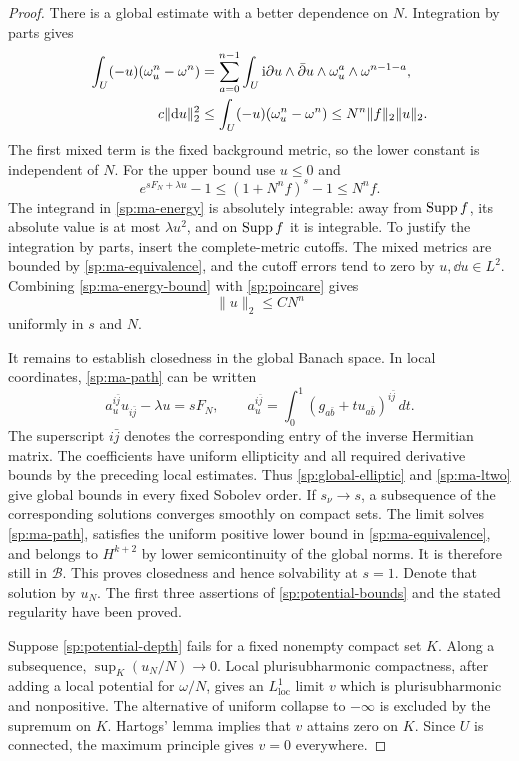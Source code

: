 \begin{proof}
There is a global estimate with a better dependence on $N$.  Integration
by parts gives
\begin{align}
 \int_U(-u)(\omega_u^n-\omega^n)
 &=\sum_{a=0}^{n-1}\int_U
   \mathrm i\partial u\wedge\bar\partial u\wedge
   \omega_u^a\wedge\omega^{n-1-a},\label{sp:ma-energy}\\
 c\|\mathrm d u\|_2^2
 &\le\int_U(-u)(\omega_u^n-\omega^n)
 \le N^n\|f\|_2\|u\|_2.\label{sp:ma-energy-bound}
\end{align}
The first mixed term is the fixed background metric, so the lower
constant is independent of $N$.  For the upper bound use $u\le0$ and
\[
 e^{sF_N+\lambda u}-1\le (1+N^nf)^s-1\le N^nf.
\]
The integrand in \eqref{sp:ma-energy} is absolutely integrable: away from
$\operatorname{Supp} f$, its absolute value is at most $\lambda u^2$, and on
$\operatorname{Supp} f$ it is integrable.  To justify the integration by parts, insert
the complete-metric cutoffs.  The mixed metrics are bounded by
\eqref{sp:ma-equivalence}, and the cutoff errors tend to zero by
$u,\dd u\in L^2$.  Combining \eqref{sp:ma-energy-bound} with
\eqref{sp:poincare} gives
\begin{equation}\label{sp:ma-ltwo}
 \|u\|_2\le C N^n
\end{equation}
uniformly in $s$ and $N$.

It remains to establish closedness in the global Banach space.  In local
coordinates, \eqref{sp:ma-path} can be written
\[
 a_u^{i\bar j}u_{i\bar j}-\lambda u=sF_N,
 \qquad
 a_u^{i\bar j}=\int_0^1(g_{a\bar b}+t u_{a\bar b})^{i\bar j}\,dt.
\]
The superscript $i\bar j$ denotes the corresponding entry of the inverse
Hermitian matrix.
The coefficients have uniform ellipticity and all required derivative
bounds by the preceding local estimates.  Thus
\eqref{sp:global-elliptic} and \eqref{sp:ma-ltwo} give global bounds in
every fixed Sobolev order.  If $s_\nu\to s$, a subsequence of the
corresponding solutions converges smoothly on compact sets.  The limit
solves \eqref{sp:ma-path}, satisfies the uniform positive lower bound in
\eqref{sp:ma-equivalence}, and belongs to $H^{k+2}$ by lower
semicontinuity of the global norms.  It is therefore still in
$\mathcal B$.  This proves closedness and hence solvability at $s=1$.
Denote that solution by $u_N$.  The first three assertions of
\eqref{sp:potential-bounds} and the stated regularity have been proved.

Suppose \eqref{sp:potential-depth} fails for a fixed nonempty compact set
$K$.  Along a subsequence,
$\sup_K(u_N/N)\to0$.  Local plurisubharmonic compactness, after adding
a local potential for $\omega/N$, gives an $L^1_{\mathrm{loc}}$ limit
$v$ which is plurisubharmonic and nonpositive.  The alternative of
uniform collapse to $-\infty$ is excluded by the supremum on $K$.
Hartogs' lemma implies that $v$ attains zero on $K$.  Since $U$ is
connected, the maximum principle gives $v=0$ everywhere.


\end{proof}

